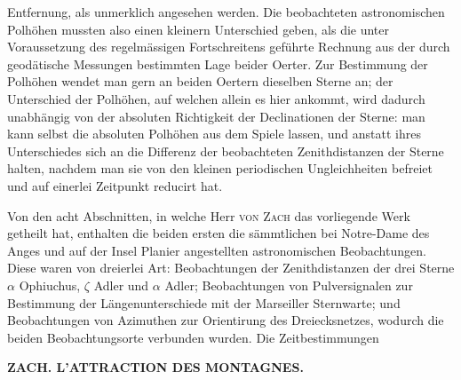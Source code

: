 Entfernung, als unmerklich angesehen werden. Die beobachteten astronomischen Polhöhen mussten also einen kleinern Unterschied geben, als die unter Voraussetzung des regelmässigen Fortschreitens geführte Rechnung aus der durch geodätische Messungen bestimmten Lage beider Oerter. Zur Bestimmung der Polhöhen wendet man gern an beiden Oertern dieselben Sterne an; der Unterschied der Polhöhen, auf welchen allein es hier ankommt, wird dadurch unabhängig von der absoluten Richtigkeit der Declinationen der Sterne: man kann selbst die absoluten Polhöhen aus dem Spiele lassen, und anstatt ihres Unterschiedes sich an die Differenz der beobachteten Zenithdistanzen der Sterne halten, nachdem man sie von den kleinen periodischen Ungleichheiten befreiet und auf einerlei Zeitpunkt reducirt hat.

Von den acht Abschnitten, in welche Herr \textsc{von Zach} das vorliegende Werk getheilt hat, enthalten die beiden ersten die sämmtlichen bei Notre-Dame des Anges und auf der Insel Planier angestellten astronomischen Beobachtungen. Diese waren von dreierlei Art: Beobachtungen der Zenithdistanzen der drei Sterne $\alpha$ Ophiuchus, $\zeta$ Adler und $\alpha$ Adler; Beobachtungen von Pulversignalen zur Bestimmung der Längenunterschiede mit der Marseiller Sternwarte; und Beobachtungen von Azimuthen zur Orientirung des Dreiecksnetzes, wodurch die beiden Beobachtungsorte verbunden wurden. Die Zeitbestimmungen\par
\clearpage
{}
\noindent\makebox[10mm][l]{}%
\parbox[b]{\dimexpr\textwidth-20mm\relax}{\centering\small\textbf{ZACH. L’ATTRACTION DES MONTAGNES.}}%
\par\nobreak\medskip
